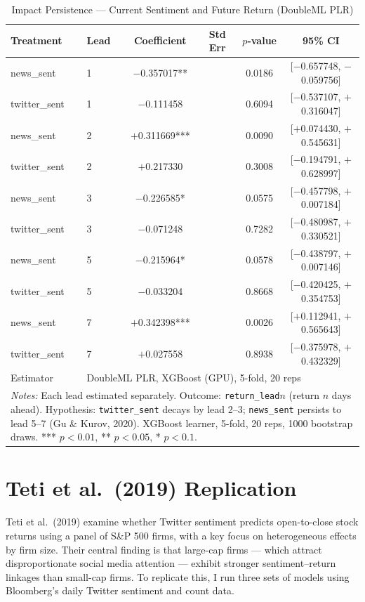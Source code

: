 \documentclass[12pt]{article}
\begin{document}
\begin{table}[htbp]
\centering
\caption{Impact Persistence --- Current Sentiment and Future Return (DoubleML PLR)}
\label{tab:impact_persist}
\begin{tabular}{llcccc}
\hline\hline
Treatment & Lead & Coefficient & Std Err & $p$-value & 95\% CI \\
\hline
news\_sent    & 1 & $-$0.357017** &  & 0.0186 & [$-$0.657748, $-$0.059756] \\
twitter\_sent & 1 & $-$0.111458   &  & 0.6094 & [$-$0.537107,  $+$0.316047] \\
news\_sent    & 2 & $+$0.311669*** &  & 0.0090 & [$+$0.074430,  $+$0.545631] \\
twitter\_sent & 2 & $+$0.217330   &  & 0.3008 & [$-$0.194791,  $+$0.628997] \\
news\_sent    & 3 & $-$0.226585*  &  & 0.0575 & [$-$0.457798,  $+$0.007184] \\
twitter\_sent & 3 & $-$0.071248   &  & 0.7282 & [$-$0.480987,  $+$0.330521] \\
news\_sent    & 5 & $-$0.215964*  &  & 0.0578 & [$-$0.438797,  $+$0.007146] \\
twitter\_sent & 5 & $-$0.033204   &  & 0.8668 & [$-$0.420425,  $+$0.354753] \\
news\_sent    & 7 & $+$0.342398*** &  & 0.0026 & [$+$0.112941,  $+$0.565643] \\
twitter\_sent & 7 & $+$0.027558   &  & 0.8938 & [$-$0.375978,  $+$0.432329] \\
\hline
Estimator & \multicolumn{5}{l}{DoubleML PLR, XGBoost (GPU), 5-fold, 20 reps} \\
\hline\hline
\multicolumn{6}{p{0.95\linewidth}}{\footnotesize \textit{Notes:} Each lead estimated separately. Outcome: \texttt{return\_lead}$n$ (return $n$ days ahead). Hypothesis: \texttt{twitter\_sent} decays by lead 2--3; \texttt{news\_sent} persists to lead 5--7 (Gu \& Kurov, 2020). XGBoost learner, 5-fold, 20 reps, 1000 bootstrap draws. *** $p<0.01$, ** $p<0.05$, * $p<0.1$.}
\end{tabular}
\end{table}

\newpage
\section{Teti et al.\ (2019) Replication}

Teti et al.\ (2019) examine whether Twitter sentiment predicts open-to-close stock returns using a panel of S\&P 500 firms, with a key focus on heterogeneous effects by firm size. Their central finding is that large-cap firms --- which attract disproportionate social media attention --- exhibit stronger sentiment--return linkages than small-cap firms. To replicate this, I run three sets of models using Bloomberg's daily Twitter sentiment and count data.
\end{document}
